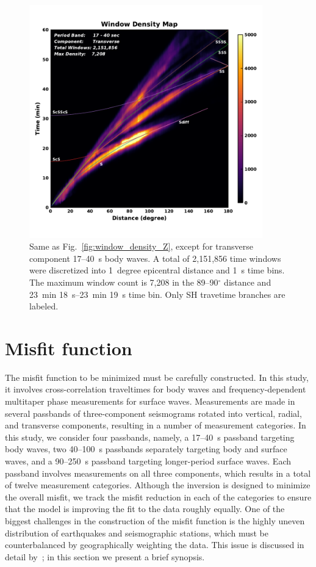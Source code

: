 \documentclass[extra,mreferee]{gji}
\begin{document}
\begin{figure}
  \centering
  \includegraphics[width=0.9\textwidth]{figures/window_colorbar_linear_T.pdf}
  \caption{\small{Same as Fig.~\ref{fig:window_density_Z}, except for transverse component 17--40~s body waves.
   A total of 2,151,856 time windows were discretized into 1~degree epicentral distance and 1~s time bins.
   The maximum window count is 7,208 in the 89--90$^\circ$ distance and 23~min 18~s--23~min 19~s time bin.
   Only SH travetime branches are labeled.}}
  \label{fig:window_density_T}
\end{figure}

\section{Misfit function}
\label{section:misfit}

The misfit function to be minimized must
be carefully constructed.
In this study,
it involves cross-correlation traveltimes
for body waves and frequency-dependent multitaper phase measurements for surface waves.
Measurements are made in several passbands of three-component seismograms rotated
into vertical, radial, and transverse components, resulting in a number of measurement
categories.
In this study, we consider four passbands, namely, a 17--40~s passband targeting body waves,
two 40--100~s passbands separately targeting body and surface waves,
and a 90--250~s passband targeting longer-period surface waves.
Each passband involves measurements on all three components,
which results in a total of twelve measurement categories.
Although the inversion is designed to minimize the overall misfit,
we track the misfit reduction in each of the categories to ensure that
the model is improving the fit to the data roughly equally.
One of the biggest challenges in the construction of the misfit function is the
highly uneven distribution of earthquakes and seismographic stations,
which must be counterbalanced by geographically weighting the data.
This issue is discussed in detail by~\cite{Ruanetal2018};
in this section we present a brief synopsis.
\end{document}
